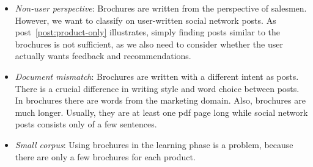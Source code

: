  \begin{itemize}
 	\item
		\emph{Non-user perspective}:
		Brochures are written from the perspective of salesmen.
		However, we want to classify on user-written social network posts.
		As post~\ref{post:product-only} illustrates, simply finding posts similar to the brochures is not sufficient, as we also need to consider whether the user actually wants feedback and recommendations.
	\item
		\emph{Document mismatch}:
		Brochures are written with a different intent as posts.
		There is a crucial difference in writing style and word choice between posts.
		In brochures there are words from the marketing domain.
		Also, brochures are much longer.
		Usually, they are at least one pdf page long while social network posts consists only of a few sentences.
	\item
		\emph{Small corpus}:
		Using brochures in the learning phase is a problem, because there are only a few brochures for each product.
 \end{itemize}


